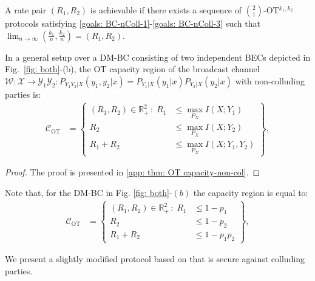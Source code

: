 \documentclass[runningheads]{llncs}
\newcommand{\parbreak}{ \vspace{0.3 em}}
\newcounter{protocol}
\begin{document}
A rate pair $(R_1,R_2)$ is achievable if there exists
a sequence of $\binom{2}{1}$-OT$^{k_1,k_2}$ protocols satisfying \eqref{goals: BC-nColl-1}-\eqref{goals: BC-nColl-3}
such that\linebreak $\lim_{n\to\infty}(\frac{k_1}{n},\frac{k_2}{n})= (R_1, R_2)$.
\begin{theorem}\label{thm: OT capacity-non-col}
    In a general setup over a DM-BC consisting of two independent BECs depicted in Fig.~\ref{fig: both}-(b), the OT capacity region of the broadcast channel $\mathcal{W}:\mathcal{X}\rightarrow \mathcal{Y}_1\mathcal{Y}_2:P_{Y_1Y_2|X}(y_1,y_2|x) = P_{Y_1|X}(y_1|x)P_{Y_2|X}(y_2|x)$ with non-colluding parties is:
    \begin{align}%
    \mathcal{C}_{\text{OT}}& =
    \left\{ 
    \begin{array}{rl}
    (R_1,R_2)\in\mathbb{R}^2_{+} \,:\;
	R_1 &\leq  \max_{P_{X}} I(X;Y_1)\\
    R_2 & \leq \max_{P_{X}} I(X;Y_2)\\
	R_1+R_2 & \leq \max_{P_{X}} I(X;Y_1,Y_2)
    \end{array}
    \right\},
    \end{align}
\end{theorem}
\begin{proof}
    The proof is presented in \ref{app: thm: OT capacity-non-col}.
\end{proof}
Note that, for the DM-BC in Fig. \ref{fig: both}-$
(b)$ the capacity region is equal to:
    \begin{align}%
    \mathcal{C}_{\text{OT}}& =
    \left\{ 
    \begin{array}{rl}
    (R_1,R_2)\in\mathbb{R}^2_{+} \,:\;
	R_1 &\leq  1-p_1\\
    R_2 & \leq 1-p_2\\
	R_1+R_2 & \leq 1-p_1p_2
    \end{array}
    \right\},
    \end{align} 

\parbreak We present a slightly modified protocol based on \cite{Mishra2} that is secure against colluding parties.
\end{document}
